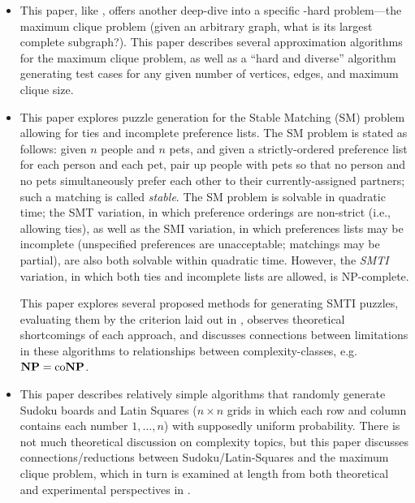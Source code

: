 \begin{itemize}
  \item {}

    \begin{annotation}
      This paper, like \textcite{hard-diverse-graph-tests}, offers another
      deep-dive into a specific \NP-hard problem---the maximum clique problem
      (given an arbitrary graph, what is its largest complete subgraph?).  This
      paper describes several approximation algorithms for the maximum clique
      problem, as well as a ``hard and diverse'' algorithm generating test
      cases for any given number of vertices, edges, and maximum clique size.
    \end{annotation}

  \item {}

    \begin{annotation}
      This paper explores puzzle generation for the Stable Matching (SM)
      problem allowing for ties and incomplete preference lists.  The SM
      problem is stated as follows: given \(n\) people and \(n\) pets, and
      given a strictly-ordered preference list for each person and each pet,
      pair up people with pets so that no person and no pets simultaneously
      prefer each other to their currently-assigned partners; such a matching
      is called \emph{stable}.  The SM problem is solvable in quadratic time;
      the SMT variation, in which preference orderings are non-strict (i.e.,
      allowing ties), as well as the SMI variation, in which preferences lists
      may be incomplete (unspecified preferences are unacceptable; matchings
      may be partial), are also both solvable within quadratic time.  However,
      the \emph{SMTI} variation, in which both ties and incomplete lists are
      allowed, is NP-complete.

      This paper explores several proposed methods for generating SMTI puzzles,
      evaluating them by the criterion laid out in
      \textcite{test-gen-complexity}, observes theoretical shortcomings of each
      approach, and discusses connections between limitations in these
      algorithms to relationships between complexity-classes, e.g. \(\mathbf{NP} = \operatorname{co}\!{\mathbf{NP}}\).
    \end{annotation}

  \item {}

    \begin{annotation}
      This paper describes relatively simple algorithms that randomly generate
      Sudoku boards and Latin Squares (\(n \times n\) grids in which each row
      and column contains each number \(1, \dotsc, n\)) with supposedly uniform
      probability.  There is not much theoretical discussion on complexity
      topics, but this paper discusses connections/reductions between
      Sudoku/Latin-Squares and the maximum clique problem, which in turn is
      examined at length from both theoretical and experimental perspectives in
      \textcite{maximum-clique-generators}.
    \end{annotation}


\end{itemize}
